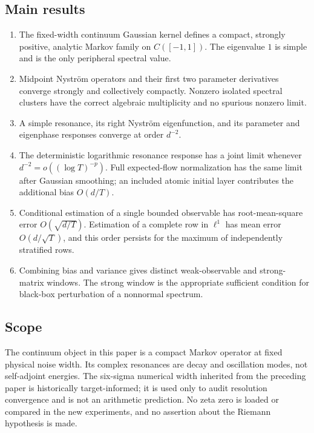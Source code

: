 \documentclass[11pt]{article}
\theoremstyle{definition}
\theoremstyle{remark}
\begin{document}
\subsection*{Main results}

\begin{enumerate}[label=\textbf{R\arabic*.},leftmargin=3.2em]
  \item The fixed-width continuum Gaussian kernel defines a compact,
  strongly positive, analytic Markov family on $C([-1,1])$.  The eigenvalue
  $1$ is simple and is the only peripheral spectral value.

  \item Midpoint Nystr\"om operators and their first two parameter derivatives
  converge strongly and collectively compactly.  Nonzero isolated spectral
  clusters have the correct algebraic multiplicity and no spurious nonzero
  limit.

  \item A simple resonance, its right Nystr\"om eigenfunction, and its
  parameter and eigenphase responses converge at order $d^{-2}$.

  \item The deterministic logarithmic resonance response has a joint limit
  whenever $d^{-2}=o((\log T)^{-p})$.  Full expected-flow normalization has
  the same limit after Gaussian smoothing; an included atomic initial layer
  contributes the additional bias $O(d/T)$.

  \item Conditional estimation of a single bounded observable has
  root-mean-square error $O(\sqrt{d/T})$.  Estimation of a complete row in
  $\ell^1$ has mean error $O(d/\sqrt T)$, and this order persists for the
  maximum of independently stratified rows.

  \item Combining bias and variance gives distinct weak-observable and
  strong-matrix windows.  The strong window is the appropriate sufficient
  condition for black-box perturbation of a nonnormal spectrum.
\end{enumerate}

\subsection*{Scope}

The continuum object in this paper is a compact Markov operator at fixed
physical noise width.  Its complex resonances are decay and oscillation modes,
not self-adjoint energies.  The six-sigma numerical width inherited from the
preceding paper is historically target-informed; it is used only to audit
resolution convergence and is not an arithmetic prediction.  No zeta zero is
loaded or compared in the new experiments, and no assertion about the
Riemann hypothesis is made.
\end{document}

